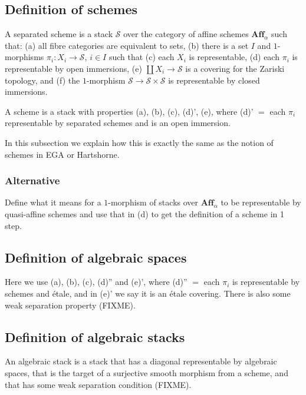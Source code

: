 \subsection{Definition of schemes}
\label{subsection-definition-schemes}

\noindent
A separated scheme is a stack $\mathcal{S}$ over the category of affine 
schemes $\mathbf{Aff}_\alpha$ such that: (a) all fibre categories are 
equivalent to sets, (b) there is a set $I$ and $1$-morphisms
$\pi_i : X_i \to \mathcal{S}$, $i\in I$ such that (c) each $X_i$ is
representable, (d) each $\pi_i$ is representable by open immersions,
(e) $\coprod X_i \to \mathcal{S}$ is a covering for the Zariski topology, 
and (f) the $1$-morphism $\mathcal{S} \to \mathcal{S}\times \mathcal{S}$ is
representable by closed immersions. 

\smallskip\noindent
A scheme is a stack with properties (a), (b), (c), (d)', (e), where
(d)' $=$ each $\pi_i$ representable by separated schemes and is an open 
immersion. 

\smallskip\noindent
In this subsection we explain how this is exactly the same as the notion of
schemes in EGA or Hartshorne.

\subsubsection{Alternative}
\label{subsubsection-schemes-alternative}

\noindent 
Define what it means for a $1$-morphism of stacks over $\textbf{Aff}_\alpha$
to be representable by quasi-affine schemes and use that in (d) to get the
definition of a scheme in 1 step.

\subsection{Definition of algebraic spaces}
\label{subsection-definition-algebraic-spaces}

\noindent
Here we use (a), (b), (c), (d)'' and (e)', where
(d)'' $=$ each $\pi_i$ is representable by schemes and \'etale, and
in (e)' we say it is an \'etale covering. There is also some weak
separation property (FIXME).

\subsection{Definition of algebraic stacks}
\label{subsection-definition-algebraic-stacks}

\noindent
An algebraic stack is a stack that has a diagonal representable by algebraic
spaces, that is the target of a surjective smooth morphism from a scheme,
and that has some weak separation condition (FIXME).

